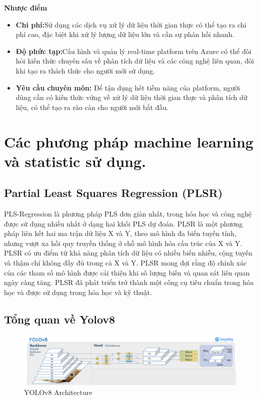 \textbf{Nhược điểm}
\begin{itemize}
    \item \textbf{Chi phí:}Sử dụng các dịch vụ xử lý dữ liệu thời gian thực có thể tạo ra chi phí cao, đặc biệt khi xử lý lượng dữ liệu lớn và cần sự phản hồi nhanh.
    \item \textbf{Độ phức tạp:}Cấu hình và quản lý real-time platform trên Azure có thể đòi hỏi kiến thức chuyên sâu về phân tích dữ liệu và các công nghệ liên quan, đôi khi tạo ra thách thức cho người mới sử dụng.
    \item  \textbf{Yêu cầu chuyên môn:} Để tận dụng hết tiềm năng của platform, người dùng cần có kiến thức vững về xử lý dữ liệu thời gian thực và phân tích dữ liệu, có thể tạo ra rào cản cho người mới bắt đầu.
\end{itemize}
\section{Các phương pháp machine learning và statistic sử dụng.}
 
\subsection{Partial Least Squares Regression (PLSR)}

PLS-Regression là phương pháp PLS đơn giản nhất, trong hóa học và công nghệ được sử dụng nhiều nhất ở dạng hai khối
PLS dự đoán. PLSR là một phương pháp liên kết hai ma trận dữ liệu X và Y, theo mô hình đa biến tuyến tính, nhưng vượt xa
hồi quy truyền thống ở chỗ mô hình hóa cấu trúc của X và Y. PLSR có ưu điểm từ khả năng phân tích
dữ liệu có nhiều biến nhiễu, cộng tuyến và thậm chí không đầy đủ trong cả X và Y. PLSR mong đợi rằng
độ chính xác của các tham số mô hình được cải thiện khi số lượng biến và quan sát liên quan ngày càng tăng.
PLSR đã phát triển trở thành một công cụ tiêu chuẩn trong hóa học và được sử dụng trong hóa học và
kỹ thuật.\cite{plsr}
\subsection{Tổng quan về Yolov8  }

\begin{center}
    \begin{figure}[h!]
    \begin{center}
     \includegraphics[scale=0.195]{img/YOLOV8_arch.png}
    \end{center}
    \caption{YOLOv8 Architecture}
    \label{refhinh21}
    \end{figure}
\end{center}

